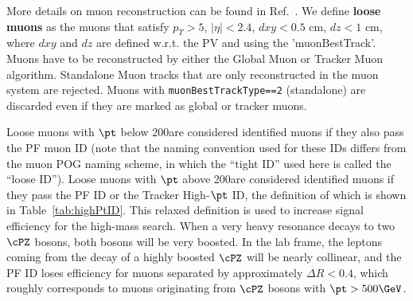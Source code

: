 More details on muon reconstruction can be found in Ref.~\cite{AN-15-277}.
We define {\bf loose muons} as the muons that satisfy  
$p_T > 5$, $|\eta| < 2.4$, $dxy< 0.5$ cm, $dz < 1$ cm, where $dxy$ and $dz$ are 
defined w.r.t. the PV and using the 'muonBestTrack'. Muons have to be 
reconstructed by either the Global Muon or Tracker Muon algorithm. Standalone 
Muon tracks that are only reconstructed in the muon system are rejected.
Muons with \verb|muonBestTrackType==2| (standalone) are discarded even if they 
are marked as global or tracker muons. 

Loose muons with $\pt$ below 200\GeV are considered identified muons if they 
also pass 
the PF muon ID (note that the naming 
convention used for these IDs differs from the muon POG naming scheme, in which the ``tight ID'' used here is called the ``loose ID''). 
Loose muons with $\pt$  above 200\GeV are considered identified muons if they pass the PF ID or the Tracker
High-$\pt$ ID, the definition of which is shown in Table~\ref{tab:highPtID}.
This relaxed definition is used to increase signal efficiency for the high-mass
search. When a very heavy resonance decays to two $\cPZ$ bosons, both bosons
will be very boosted. In the lab frame, the leptons coming from the decay of
a highly boosted $\cPZ$ will be nearly collinear, and the PF ID loses 
efficiency for muons separated by approximately $\Delta R < 0.4$, which roughly 
corresponds to muons originating from $\cPZ$ bosons with $\pt > 500\GeV$.

